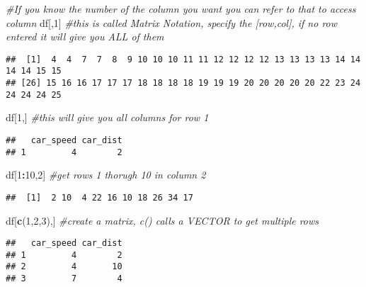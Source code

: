 \documentclass[
]{article}
\newenvironment{Shaded}{\begin{snugshade}}{\end{snugshade}}
\newcommand{\CommentTok}[1]{\textcolor[rgb]{0.56,0.35,0.01}{\textit{#1}}}
\newcommand{\DecValTok}[1]{\textcolor[rgb]{0.00,0.00,0.81}{#1}}
\newcommand{\FunctionTok}[1]{\textcolor[rgb]{0.13,0.29,0.53}{\textbf{#1}}}
\newcommand{\NormalTok}[1]{#1}
\newcommand{\SpecialCharTok}[1]{\textcolor[rgb]{0.81,0.36,0.00}{\textbf{#1}}}
\begin{document}
\begin{Shaded}
\begin{Highlighting}[]
\CommentTok{\#If you know the number of the column you want you can refer to that to access column}
\NormalTok{df[,}\DecValTok{1}\NormalTok{] }\CommentTok{\#this is called Matrix Notation, specify the [row,col], if no row entered it will give you ALL of them}
\end{Highlighting}
\end{Shaded}

\begin{verbatim}
##  [1]  4  4  7  7  8  9 10 10 10 11 11 12 12 12 12 13 13 13 13 14 14 14 14 15 15
## [26] 15 16 16 17 17 17 18 18 18 18 19 19 19 20 20 20 20 20 22 23 24 24 24 24 25
\end{verbatim}

\begin{Shaded}
\begin{Highlighting}[]
\NormalTok{df[}\DecValTok{1}\NormalTok{,] }\CommentTok{\#this will give you all columns for row 1}
\end{Highlighting}
\end{Shaded}

\begin{verbatim}
##   car_speed car_dist
## 1         4        2
\end{verbatim}

\begin{Shaded}
\begin{Highlighting}[]
\NormalTok{df[}\DecValTok{1}\SpecialCharTok{:}\DecValTok{10}\NormalTok{,}\DecValTok{2}\NormalTok{] }\CommentTok{\#get rows 1 thorugh 10 in column 2}
\end{Highlighting}
\end{Shaded}

\begin{verbatim}
##  [1]  2 10  4 22 16 10 18 26 34 17
\end{verbatim}

\begin{Shaded}
\begin{Highlighting}[]
\NormalTok{df[}\FunctionTok{c}\NormalTok{(}\DecValTok{1}\NormalTok{,}\DecValTok{2}\NormalTok{,}\DecValTok{3}\NormalTok{),] }\CommentTok{\#create a matrix, c() calls a VECTOR to get multiple rows}
\end{Highlighting}
\end{Shaded}

\begin{verbatim}
##   car_speed car_dist
## 1         4        2
## 2         4       10
## 3         7        4
\end{verbatim}
\end{document}

